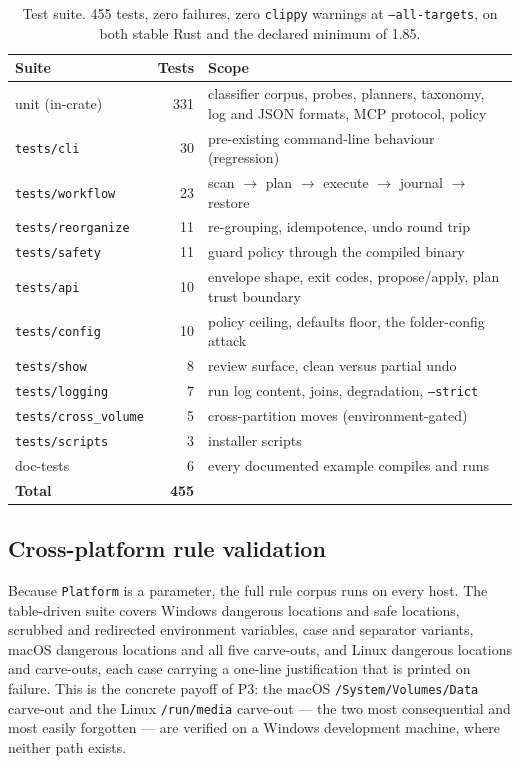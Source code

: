 \documentclass[11pt,a4paper]{article}
\newcommand{\code}[1]{\texttt{\small #1}}
\begin{document}
\begin{table}[t]
\centering
\small
\caption{Test suite. 455 tests, zero failures, zero \code{clippy} warnings at
\code{--all-targets}, on both stable Rust and the declared minimum of 1.85.}
\label{tab:tests}
\begin{tabularx}{\textwidth}{@{}l r X@{}}
\toprule
\textbf{Suite} & \textbf{Tests} & \textbf{Scope} \\
\midrule
unit (in-crate)        & 331 & classifier corpus, probes, planners, taxonomy, log and JSON formats, MCP protocol, policy \\
\code{tests/cli}       & 30  & pre-existing command-line behaviour (regression) \\
\code{tests/workflow}  & 23  & scan $\rightarrow$ plan $\rightarrow$ execute $\rightarrow$ journal $\rightarrow$ restore \\
\code{tests/reorganize}& 11  & re-grouping, idempotence, undo round trip \\
\code{tests/safety}    & 11  & guard policy through the compiled binary \\
\code{tests/api}       & 10  & envelope shape, exit codes, propose/apply, plan trust boundary \\
\code{tests/config}    & 10  & policy ceiling, defaults floor, the folder-config attack \\
\code{tests/show}      & 8   & review surface, clean versus partial undo \\
\code{tests/logging}   & 7   & run log content, joins, degradation, \code{--strict} \\
\code{tests/cross\_volume} & 5 & cross-partition moves (environment-gated) \\
\code{tests/scripts}   & 3   & installer scripts \\
doc-tests              & 6   & every documented example compiles and runs \\
\midrule
\textbf{Total}         & \textbf{455} & \\
\bottomrule
\end{tabularx}
\end{table}

\subsection{Cross-platform rule validation}

Because \code{Platform} is a parameter, the full rule corpus runs on every host. The
table-driven suite covers Windows dangerous locations and safe locations, scrubbed and
redirected environment variables, case and separator variants, macOS dangerous
locations and all five carve-outs, and Linux dangerous locations and carve-outs, each
case carrying a one-line justification that is printed on failure. This is the concrete
payoff of P3: the macOS \code{/System/Volumes/Data} carve-out and the Linux
\code{/run/media} carve-out --- the two most consequential and most easily forgotten
--- are verified on a Windows development machine, where neither path exists.
\end{document}
